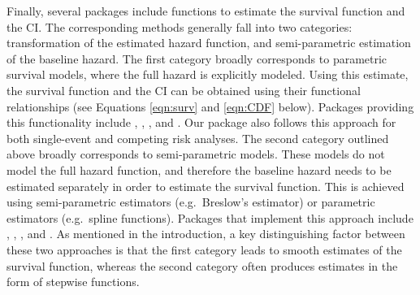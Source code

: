 Finally, several packages include functions to estimate the survival
function and the CI. The corresponding methods generally fall into two
categories: transformation of the estimated hazard function, and
semi-parametric estimation of the baseline hazard. The first category
broadly corresponds to parametric survival models, where the full hazard
is explicitly modeled. Using this estimate, the survival function and
the CI can be obtained using their functional relationships (see
Equations \ref{eqn:surv} and \ref{eqn:CDF} below). Packages providing
this functionality include , , , and
. Our package  also follows this approach
for both single-event and competing risk analyses. The second category
outlined above broadly corresponds to semi-parametric models. These
models do not model the full hazard function, and therefore the baseline
hazard needs to be estimated separately in order to estimate the
survival function. This is achieved using semi-parametric estimators
(e.g.~Breslow's estimator) or parametric estimators (e.g.~spline
functions). Packages that implement this approach include
, , , and . As
mentioned in the introduction, a key distinguishing factor between these
two approaches is that the first category leads to smooth estimates of
the survival function, whereas the second category often produces
estimates in the form of stepwise functions.

